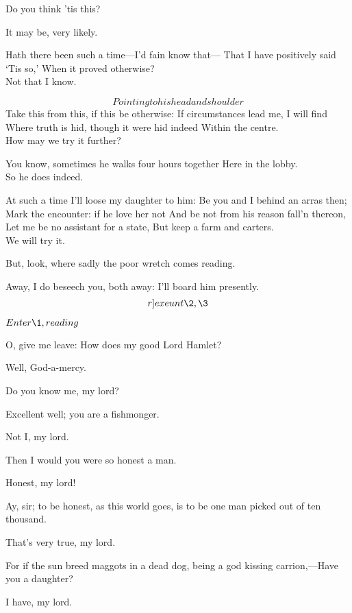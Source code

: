 \documentclass[11pt]{book}
\begin{document}
\2	Do you think 'tis this?

\3	It may be, very likely.

\5	Hath there been such a time---I'd fain know that---
	That I have positively said `Tis so,'
	When it proved otherwise? \\

\2	Not that I know.

\5	\[Pointing to his head and shoulder\]
	Take this from this, if this be otherwise:
	If circumstances lead me, I will find
	Where truth is hid, though it were hid indeed
	Within the centre. \\

\2	                  How may we try it further?

\5	You know, sometimes he walks four hours together
	Here in the lobby. \\

\3	                  So he does indeed.

\5	At such a time I'll loose my daughter to him:
	Be you and I behind an arras then;
	Mark the encounter: if he love her not
	And be not from his reason fall'n thereon,
	Let me be no assistant for a state,
	But keep a farm and carters. \\

\2	We will try it.

\3	But, look, where sadly the poor wretch comes reading.

\5	Away, I do beseech you, both away:
	I'll board him presently. \\ \[r]exeunt \2, \3\]

	\(Enter \1, reading\)

		    O, give me leave:
\Prosa
	How does my good Lord Hamlet?

\1	Well, God-a-mercy.

\5	Do you know me, my lord?

\1	Excellent well; you are a fishmonger.

\5	Not I, my lord.

\1	Then I would you were so honest a man.

\5	Honest, my lord!

\1	Ay, sir; to be honest, as this world goes, is to be
	one man picked out of ten thousand.

\5	That's very true, my lord.

\1	For if the sun breed maggots in a dead dog, being a
	god kissing carrion,---Have you a daughter?

\5	I have, my lord.
\end{document}
